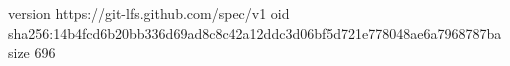 version https://git-lfs.github.com/spec/v1
oid sha256:14b4fcd6b20bb336d69ad8c8c42a12ddc3d06bf5d721e778048ae6a7968787ba
size 696
